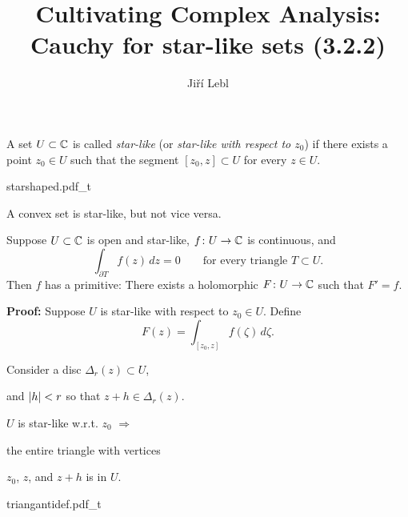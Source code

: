 \documentclass[10pt,aspectratio=169]{beamer}
\author{Ji\v{r}\'i Lebl}
\institute[OSU]{%
Departemento pri Matematiko de Oklahoma {\^S}tata Universitato}
\title{Cultivating Complex Analysis:\\%
Cauchy for star-like sets (3.2.2)}
\date{}
\begin{document}
\begin{frame}
\titlepage
\end{frame}
\begin{frame}
\begin{definition}
A set $U \subset {\mathbb{C}}$ is called \emph{{star-like}} (or
\emph{star-like with respect to $z_0$}) if there exists a
point $z_0 \in U$ such that the segment $[z_0,z] \subset U$ for every
$z \in U$.
\end{definition}

\medskip
\pause

\begin{center}
{starshaped.pdf_t}
\end{center}

\medskip
\pause

A convex set is star-like, but not vice versa.

\end{frame}

\begin{frame}

\begin{proposition} \label{prop:primitiveinstarlike1}
Suppose $U \subset {\mathbb{C}}$ is open and star-like,
$f \colon U \to {\mathbb{C}}$ is continuous, and
\begin{equation*}
\int_{\partial T} f(z) \, dz = 0
\qquad \text{for every triangle $T \subset U$.}
\end{equation*}
Then $f$ has a primitive:
There exists a holomorphic $F \colon U \to {\mathbb{C}}$
such that $F' = f$.
\end{proposition}

\pause

\textbf{Proof:}
Suppose $U$ is star-like with respect to $z_0 \in U$.
\pause
Define
\begin{equation*}
F(z) = \int_{[z_0,z]} f(\zeta) \, d\zeta .
\end{equation*}
\pause

\vspace*{-0.2in}
Consider a disc $\Delta_r(z) \subset U$,

and $\lvert {h} \rvert < r$ so that $z+h \in \Delta_r(z)$.

\pause
\medskip

$U$ is star-like w.r.t. $z_0$ $\Rightarrow$

the entire triangle with vertices

$z_0$, $z$, and $z+h$ is in $U$.

\vspace*{-1.2in}

\hspace*{2.2in}%
{triangantidef.pdf_t}
\end{frame}
\end{document}
